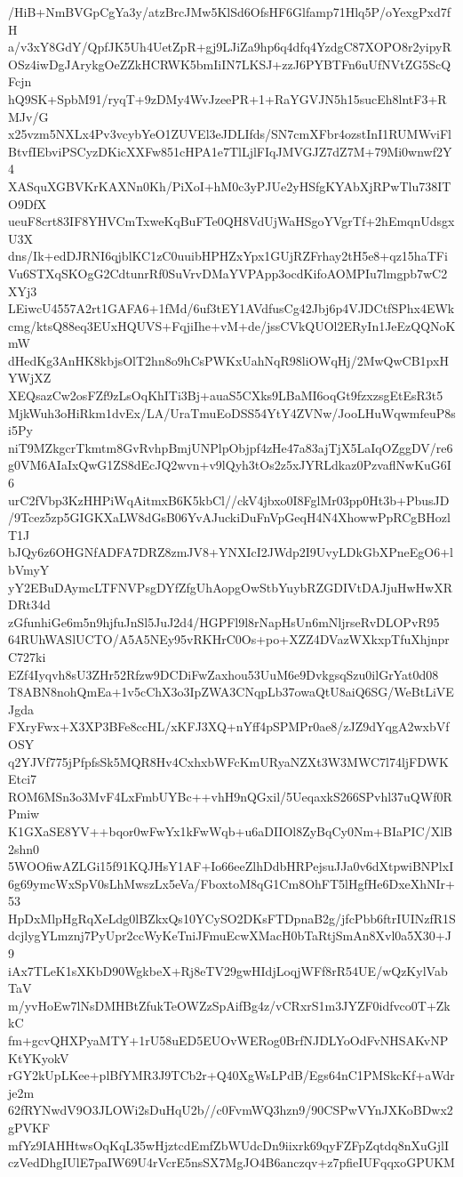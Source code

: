 /HiB+NmBVGpCgYa3y/atzBrcJMw5KlSd6OfsHF6Glfamp71Hlq5P/oYexgPxd7fH
a/v3xY8GdY/QpfJK5Uh4UetZpR+gj9LJiZa9hp6q4dfq4YzdgC87XOPO8r2yipyR
OSz4iwDgJArykgOeZZkHCRWK5bmIiIN7LKSJ+zzJ6PYBTFn6uUfNVtZG5ScQFcjn
hQ9SK+SpbM91/ryqT+9zDMy4WvJzeePR+1+RaYGVJN5h15sucEh8lntF3+RMJv/G
x25vzm5NXLx4Pv3vcybYeO1ZUVEl3eJDLIfds/SN7cmXFbr4ozstInI1RUMWviFl
BtvfIEbviPSCyzDKicXXFw851cHPA1e7TlLjlFIqJMVGJZ7dZ7M+79Mi0wnwf2Y4
XASquXGBVKrKAXNn0Kh/PiXoI+hM0c3yPJUe2yHSfgKYAbXjRPwTlu738ITO9DfX
ueuF8crt83IF8YHVCmTxweKqBuFTe0QH8VdUjWaHSgoYVgrTf+2hEmqnUdsgxU3X
dns/Ik+edDJRNI6qjblKC1zC0uuibHPHZxYpx1GUjRZFrhay2tH5e8+qz15haTFi
Vu6STXqSKOgG2CdtunrRf0SuVrvDMaYVPApp3ocdKifoAOMPIu7lmgpb7wC2XYj3
LEiwcU4557A2rt1GAFA6+1fMd/6uf3tEY1AVdfusCg42Jbj6p4VJDCtfSPhx4EWk
cmg/ktsQ88eq3EUxHQUVS+FqjiIhe+vM+de/jssCVkQUOl2ERyIn1JeEzQQNoKmW
dHedKg3AnHK8kbjsOlT2hn8o9hCsPWKxUahNqR98liOWqHj/2MwQwCB1pxHYWjXZ
XEQsazCw2osFZf9zLsOqKhITi3Bj+auaS5CXks9LBaMI6oqGt9fzxzsgEtEsR3t5
MjkWuh3oHiRkm1dvEx/LA/UraTmuEoDSS54YtY4ZVNw/JooLHuWqwmfeuP8si5Py
niT9MZkgcrTkmtm8GvRvhpBmjUNPlpObjpf4zHe47a83ajTjX5LaIqOZggDV/re6
g0VM6AIaIxQwG1ZS8dEcJQ2wvn+v9lQyh3tOs2z5xJYRLdkaz0PzvaflNwKuG6I6
urC2fVbp3KzHHPiWqAitmxB6K5kbCl//ckV4jbxo0I8FglMr03pp0Ht3b+PbusJD
/9Tcez5zp5GIGKXaLW8dGsB06YvAJuckiDuFnVpGeqH4N4XhowwPpRCgBHozlT1J
bJQy6z6OHGNfADFA7DRZ8zmJV8+YNXIcI2JWdp2I9UvyLDkGbXPneEgO6+lbVmyY
yY2EBuDAymcLTFNVPsgDYfZfgUhAopgOwStbYuybRZGDIVtDAJjuHwHwXRDRt34d
zGfunhiGe6m5n9hjfuJnSl5JuJ2d4/HGPFl9l8rNapHsUn6mNljrseRvDLOPvR95
64RUhWASlUCTO/A5A5NEy95vRKHrC0Os+po+XZZ4DVazWXkxpTfuXhjnprC727ki
EZf4Iyqvh8sU3ZHr52Rfzw9DCDiFwZaxhou53UuM6e9DvkgsqSzu0ilGrYat0d08
T8ABN8nohQmEa+1v5cChX3o3IpZWA3CNqpLb37owaQtU8aiQ6SG/WeBtLiVEJgda
FXryFwx+X3XP3BFe8ccHL/xKFJ3XQ+nYff4pSPMPr0ae8/zJZ9dYqgA2wxbVfOSY
q2YJVf775jPfpfsSk5MQR8Hv4CxhxbWFcKmURyaNZXt3W3MWC7l74ljFDWKEtci7
ROM6MSn3o3MvF4LxFmbUYBc++vhH9nQGxil/5UeqaxkS266SPvhl37uQWf0RPmiw
K1GXaSE8YV++bqor0wFwYx1kFwWqb+u6aDIIOl8ZyBqCy0Nm+BIaPIC/XlB2shn0
5WOOfiwAZLGi15f91KQJHsY1AF+Io66eeZlhDdbHRPejsuJJa0v6dXtpwiBNPlxI
6g69ymcWxSpV0sLhMwszLx5eVa/FboxtoM8qG1Cm8OhFT5lHgfHe6DxeXhNIr+53
HpDxMlpHgRqXeLdg0lBZkxQs10YCySO2DKsFTDpnaB2g/jfcPbb6ftrIUINzfR1S
dcjlygYLmznj7PyUpr2ccWyKeTniJFmuEcwXMacH0bTaRtjSmAn8Xvl0a5X30+J9
iAx7TLeK1sXKbD90WgkbeX+Rj8eTV29gwHIdjLoqjWFf8rR54UE/wQzKylVabTaV
m/yvHoEw7lNsDMHBtZfukTeOWZzSpAifBg4z/vCRxrS1m3JYZF0idfvco0T+ZkkC
fm+gcvQHXPyaMTY+1rU58uED5EUOvWERog0BrfNJDLYoOdFvNHSAKvNPKtYKyokV
rGY2kUpLKee+plBfYMR3J9TCb2r+Q40XgWsLPdB/Egs64nC1PMSkcKf+aWdrje2m
62fRYNwdV9O3JLOWi2sDuHqU2b//c0FvmWQ3hzn9/90CSPwVYnJXKoBDwx2gPVKF
mfYz9IAHHtwsOqKqL35wHjztcdEmfZbWUdcDn9iixrk69qyFZFpZqtdq8nXuGjlI
czVedDhgIUlE7paIW69U4rVcrE5nsSX7MgJO4B6anczqv+z7pfieIUFqqxoGPUKM
